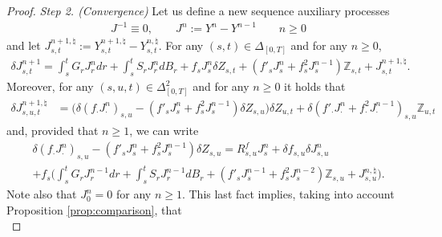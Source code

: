 \documentclass[11pt,a4paper]{article}
\theoremstyle{plain}
\begin{document}
\begin{proof}
    \textit{Step 2. (Convergence)} Let us define a new sequence auxiliary processes \begin{equation*} \label{eq:definitionofJ^n}
        \begin{aligned}
            J^{-1} \equiv0, \qquad J^{n} := Y^{n} - Y^{n-1} \qquad n\ge 0
        \end{aligned}
    \end{equation*} 
    and let $J^{n+1,\natural}_{s,t}:=Y^{n+1,\natural}_{s,t} - Y^{n,\natural}_{s,t}$. 
    For any $(s,t)\in\Delta_{[0,T]}$ and for any $n\ge 0$,  \begin{equation*} \label{eq:deltaJ^ninexistence} \begin{aligned}
        \delta J^{n+1}_{s,t} %
        =  \int_s^tG_rJ_r^ndr + \int_s^tS_rJ_r^ndB_r + f_sJ_s^n\delta Z_{s,t} + (f'_sJ^n_s+f_s^2J^{n-1}_s)\mathbb{Z}_{s,t} + J^{n+1,\natural}_{s,t}. 
    \end{aligned} 
    \end{equation*}
    Moreover, for any $(s,u,t) \in \Delta_{[0,T]}^2$ and for any $n \ge 0$ it holds that \begin{equation*} \label{eq:deltaJ^n+1natural1}
        \begin{aligned}
            \delta J^{n+1,\natural}_{s,u,t} %
            &= \big(\delta (f_\cdot J^n_\cdot)_{s,u} -  (f'_sJ^n_s+f_s^2J^{n-1}_s)\delta Z_{s,u}\big) \delta Z_{u,t} + \delta (f'_\cdot J^n_\cdot +f_\cdot^2 J^{n-1}_\cdot)_{s,u} \mathbb{Z}_{u,t}
        \end{aligned}
    \end{equation*} and, provided that $n \ge 1$, we can write  \begin{multline*} \label{eq:deltaJ^n+1natural2}
            \delta (f_\cdot J^n_\cdot)_{s,u} -  (f'_sJ^n_s+f_s^2J^{n-1}_s)\delta Z_{s,u} 
            = R^f_{s,u} J_s^n +\delta{f}_{s,u}\delta{J}^n_{s,u}  \\ + f_s \Big(\int_s^tG_rJ^{n-1}_rdr + \int_s^tS_rJ^{n-1}_rdB_r +(f'_sJ^{n-1}_s+f^2_sJ^{n-2}_s)\mathbb{Z}_{s,u}+J^{n,\natural}_{s,u}\Big) .
    \end{multline*}
    Note also that $J^n_0=0$ for any $n \ge 1$. 
    This last fact implies, taking into account Proposition \ref{prop:comparison}, that \begin{equation*} \label{eq:comparisoninpicarditeration}

\end{equation*}
\end{proof}
\end{document}
